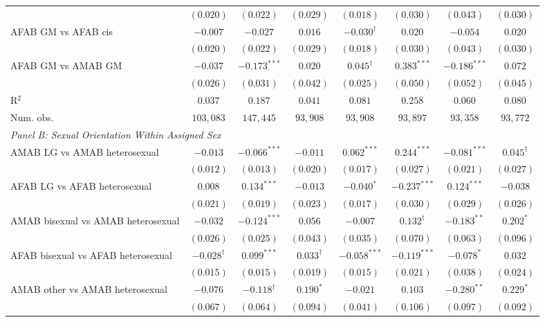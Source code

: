 \begin{table}[htpb!]
{\begin{tabular}{l c c c c c c c}
 & $(0.020)$ & $(0.022)$ & $(0.029)$ & $(0.018)$ & $(0.030)$ & $(0.043)$ & $(0.030)$ \\
AFAB GM vs AFAB cis & $-0.007$ & $-0.027$ & $0.016$ & $-0.030^{\dagger}$ & $0.020$ & $-0.054$ & $0.020$ \\
 & $(0.020)$ & $(0.022)$ & $(0.029)$ & $(0.018)$ & $(0.030)$ & $(0.043)$ & $(0.030)$ \\
AFAB GM vs AMAB GM & $-0.037$ & $-0.173^{***}$ & $0.020$ & $0.045^{\dagger}$ & $0.383^{***}$ & $-0.186^{***}$ & $0.072$ \\
 & $(0.026)$ & $(0.031)$ & $(0.042)$ & $(0.025)$ & $(0.050)$ & $(0.052)$ & $(0.045)$ \\
\hline
R$^2$ & $0.037$ & $0.187$ & $0.041$ & $0.081$ & $0.258$ & $0.060$ & $0.080$ \\
Num. obs. & $103,083$ & $147,445$ & $93,908$ & $93,908$ & $93,897$ & $93,358$ & $93,772$ \\
\hline
\multicolumn{8}{l}{\textit{Panel B: Sexual Orientation Within Assigned Sex}} \\
AMAB LG vs AMAB heterosexual & $-0.013$ & $-0.066^{***}$ & $-0.011$ & $0.062^{***}$ & $0.244^{***}$ & $-0.081^{***}$ & $0.045^{\dagger}$ \\
 & $(0.012)$ & $(0.013)$ & $(0.020)$ & $(0.017)$ & $(0.027)$ & $(0.021)$ & $(0.027)$ \\
AFAB LG vs AFAB heterosexual & $0.008$ & $0.134^{***}$ & $-0.013$ & $-0.040^{*}$ & $-0.237^{***}$ & $0.124^{***}$ & $-0.038$ \\
 & $(0.021)$ & $(0.019)$ & $(0.023)$ & $(0.017)$ & $(0.030)$ & $(0.029)$ & $(0.026)$ \\
AMAB bisexual vs AMAB heterosexual & $-0.032$ & $-0.124^{***}$ & $0.056$ & $-0.007$ & $0.132^{\dagger}$ & $-0.183^{**}$ & $0.202^{*}$ \\
 & $(0.026)$ & $(0.025)$ & $(0.043)$ & $(0.035)$ & $(0.070)$ & $(0.063)$ & $(0.096)$ \\
AFAB bisexual vs AFAB heterosexual & $-0.028^{\dagger}$ & $0.099^{***}$ & $0.033^{\dagger}$ & $-0.058^{***}$ & $-0.119^{***}$ & $-0.078^{*}$ & $0.032$ \\
 & $(0.015)$ & $(0.015)$ & $(0.019)$ & $(0.015)$ & $(0.021)$ & $(0.038)$ & $(0.024)$ \\
AMAB other vs AMAB heterosexual & $-0.076$ & $-0.118^{\dagger}$ & $0.190^{*}$ & $-0.021$ & $0.103$ & $-0.280^{**}$ & $0.229^{*}$ \\
 & $(0.067)$ & $(0.064)$ & $(0.094)$ & $(0.041)$ & $(0.106)$ & $(0.097)$ & $(0.092)$ \\

\end{tabular}}
\end{table}
